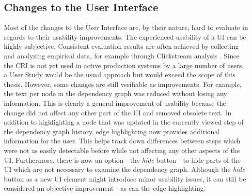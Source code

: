 	\subsection{Changes to the User Interface}
	Most of the changes to the User Interface are, by their nature, hard to evaluate in regards to their usability improvements. The experienced usability of a UI can be highly subjective. Consistent evaluation results are often achieved by collecting and analyzing empirical data, for example through Clickstream analysis \cite{Clickstream}. Since the CRI is not yet used in active production systems by a large number of users, a User Study would be the usual approach but would exceed the scope of this thesis. However, some changes are still verifiable as improvements. For example, the text per node in the dependency graph was reduced without losing any information. This is clearly a general improvement of usability because the change did not affect any other part of the UI and removed obsolete text. 
	In addition to highlighting a node that was updated in the currently viewed step of the dependency graph history, edge highlighting now provides additional information for the user. This helps track down differences between steps which were not as easily detectable before while not affecting any other aspects of the UI. Furthermore, there is now an option - the \emph{hide} button - to hide parts of the UI which are not necessary to examine the dependency graph. Although the \emph{hide} button as a new UI element might introduce minor usability issues, it can still be considered an objective improvement - as can the edge highlighting.

